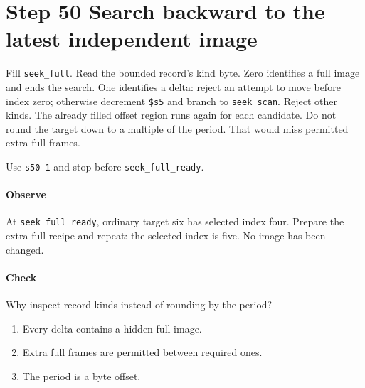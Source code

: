 \section{Step 50 Search backward to the latest independent image}
Fill \texttt{seek\_full}. Read the bounded record's kind byte. Zero identifies a full image and ends the search. One identifies a delta: reject an attempt to move before index zero; otherwise decrement \texttt{\$s5} and branch to \texttt{seek\_scan}. Reject other kinds. The already filled offset region runs again for each candidate. Do not round the target down to a multiple of the period. That would miss permitted extra full frames.

Use \texttt{s50-1} and stop before \texttt{seek\_full\_ready}.

\paragraph{Observe} At \texttt{seek\_full\_ready}, ordinary target six has selected index four. Prepare the extra-full recipe and repeat: the selected index is five. No image has been changed.

\paragraph{Check} Why inspect record kinds instead of rounding by the period?
\begin{enumerate}[label=\Alph*.]
  \item Every delta contains a hidden full image.
  \item Extra full frames are permitted between required ones.
  \item The period is a byte offset.
\end{enumerate}
